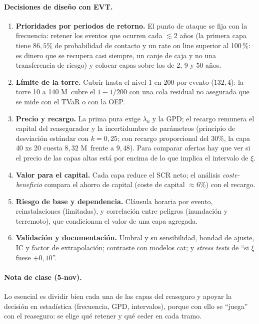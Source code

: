 \documentclass[a4paper,12pt]{article}
\newcommand{\euro}{\texteuro}
\begin{document}
\paragraph{Decisiones de dise\~no con EVT.}
\begin{enumerate}[leftmargin=*,itemsep=2pt]
\item \textbf{Prioridades por periodos de retorno.} El punto de ataque se fija con la frecuencia: retener los eventos que ocurren cada $\lesssim2$ a\~nos (la primera capa tiene $86{,}5\%$ de probabilidad de contacto y un rate on line superior al 100\,\%: es dinero que se recupera casi siempre, un canje de caja y no una transferencia de riesgo) y colocar capas sobre los de 2, 9 y 50 a\~nos.
\item \textbf{L\'imite de la torre.} Cubrir hasta el nivel 1-en-200 por evento ($132{,}4$): la torre 10 a 140 M\euro\ cubre el $1\!-\!1/200$ con una cola residual no asegurada que se mide con el TVaR o con la OEP.
\item \textbf{Precio y recargo.} La prima pura exige $\lambda_u$ y la GPD; el recargo remunera el capital del reasegurador y la incertidumbre de par\'ametros (principio de desviaci\'on est\'andar con $k=0{,}25$; con recargo proporcional del $30\%$, la capa 40 xs 20 cuesta $8{,}32$ M\euro\ frente a $9{,}48$). Para comparar ofertas hay que ver si el precio de las capas altas est\'a por encima de lo que implica el intervalo de $\xi$.
\item \textbf{Valor para el capital.} Cada capa reduce el SCR neto; el an\'alisis \emph{coste-beneficio} compara el ahorro de capital (coste de capital $\approx6\%$) con el recargo.
\item \textbf{Riesgo de base y dependencia.} Cl\'ausula horaria por evento, reinstalaciones (limitadas), y correlaci\'on entre peligros (inundaci\'on y terremoto), que condicionan el valor de una capa agregada.
\item \textbf{Validaci\'on y documentaci\'on.} Umbral y su sensibilidad, bondad de ajuste, IC y factor de extrapolaci\'on; contraste con modelos cat; y \emph{stress tests} de ``si $\xi$ fuese $+0{,}10$''.
\end{enumerate}

\paragraph{Nota de clase (5-nov).} Lo esencial es dividir bien cada una de las capas del reaseguro y apoyar la decisi\'on en estad\'istica (frecuencia, GPD, intervalos), porque con ello se ``juega'' con el reaseguro: se elige qu\'e retener y qu\'e ceder en cada tramo.
\end{document}
